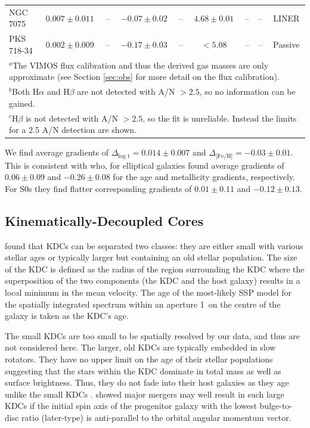 \documentclass[a4paper,fleqn,usenatbib]{mnras}
\begin{document}
\begin{table}
\begin{tabular}{l c c c c c c c c}
					NGC 7075 	& $0.007 \pm 0.011$ & -- & $-0.07 \pm 0.02$ & -- & $4.68 \pm 0.01$	& -- 		& -- & LINER \\
					PKS 718-34  & $0.002 \pm 0.009$ & -- & $-0.17 \pm 0.03$ & -- & $< 5.08$	 		& -- 		& -- & Passive \\
				\hline
				\hline
				\multicolumn{9}{L{.95\linewidth}}{$^{a}$The VIMOS flux calibration and thus the derived gas masses are only approximate (see Section \ref{sec:obs} for more detail on the flux calibration).} \\
				\multicolumn{9}{L{.95\linewidth}}{$^{b}$Both H$\alpha$ and H$\beta$ are not detected with A/N $>2.5$, so no information can be gained.} \\
				\multicolumn{9}{L{.95\linewidth}}{$^{c}$H$\beta$ is not detected with A/N $> 2.5$, so the fit is unreliable. Instead the limits for a 2.5 A/N detection are shown.}
			\end{tabular}
		\end{table}

		We find average gradients of $\Delta_\text{log t} = 0.014\pm0.007$ and $\Delta_\text{[Fe/H]} = -0.03\pm0.01$. This is consistent with \citet{Koleva2011} who, for elliptical galaxies found average gradients of $0.06\pm0.09$ and $-0.26\pm0.08$ for the age and metallicity gradients, respectively. For S0s they find flatter corresponding gradients of $0.01\pm0.11$ and $-0.12\pm0.13$. 

	\subsection{Kinematically-Decoupled Cores}
		\label{subsec:popKDC}
		\citet{Kuntschner2010} found that KDCs can be separated two classes: they are either small with various stellar ages or typically larger but containing an old stellar population. The size of the KDC is defined as the radius of the region surrounding the KDC where the superposition of the two components (the KDC and the host galaxy) results in a local minimum in the mean velocity. The age of the most-likely SSP model for the spatially integrated spectrum within an aperture 1\arcsec\ on the centre of the galaxy is taken as the KDC's age.

		The small KDCs are too small to be spatially resolved by our data, and thus are not considered here. The larger, old KDCs are typically embedded in slow rotators. They have no upper limit on the age of their stellar populations suggesting that the stars within the KDC dominate in total mass as well as surface brightness. Thus, they do not fade into their host galaxies as they age unlike the small KDCs \citep{Kuntschner2010}. \citet{Bois2011} showed major mergers may well result in such large KDCs if the initial spin axis of the progenitor galaxy with the lowest bulge-to-disc ratio (later-type) is anti-parallel to the orbital angular momentum vector. 
\end{document}
